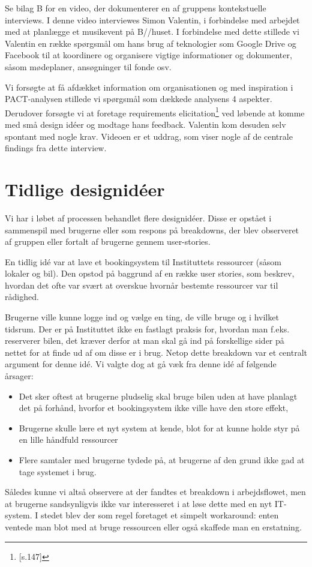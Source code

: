 Se bilag B for en video, der dokumenterer en af gruppens kontekstuelle interviews. I denne video interviewes Simon Valentin, i forbindelse med arbejdet med at planlægge et musikevent på B//huset. I forbindelse med dette stillede vi Valentin en række spørgsmål om hans brug af teknologier som Google Drive og Facebook til at koordinere og organisere vigtige informationer og dokumenter, såsom mødeplaner, ansøgninger til fonde osv.

Vi forsøgte at få afdækket information om organisationen og med inspiration i PACT-analysen stillede vi spørgsmål som dækkede analysens 4 aspekter. Derudover forsøgte vi at foretage requirements elicitation\footnote{\citep{Benyon}[s.147]} ved løbende at komme med små design idéer og modtage hans feedback. Valentin kom desuden selv spontant med nogle krav. Videoen er et uddrag, som viser nogle af de centrale findings fra dette interview.

\section{Tidlige designidéer}
Vi har i løbet af processen behandlet flere designidéer. Disse er opstået i sammenspil med brugerne eller som respons på breakdowns, der blev observeret af gruppen eller fortalt af brugerne gennem user-stories.

En tidlig idé var at lave et bookingsystem til Instituttets ressourcer (såsom lokaler og bil). Den opstod på baggrund af en række user stories, som beskrev, hvordan det ofte var svært at overskue hvornår bestemte ressourcer var til rådighed.

Brugerne ville kunne logge ind og vælge en ting, de ville bruge og i hvilket tidsrum. Der er på Instituttet ikke en fastlagt praksis for, hvordan man f.eks. reserverer bilen, det kræver derfor at man skal gå ind på forskellige sider på nettet for at finde ud af om disse er i brug. Netop dette breakdown var et centralt argument for denne idé. 
Vi valgte dog at gå væk fra denne idé af følgende årsager: 
\begin{itemize}
	\item Det sker oftest at brugerne pludselig skal bruge bilen uden at have planlagt det på forhånd, hvorfor et bookingsystem ikke ville have den store effekt,
	\item Brugerne skulle lære et nyt system at kende, blot for at kunne holde styr på en lille håndfuld ressourcer
	\item Flere samtaler med brugerne tydede på, at brugerne af den grund ikke gad at tage systemet i brug.
\end{itemize}
Således kunne vi altså observere at der fandtes et breakdown i arbejdsflowet, men at brugerne sandsynligvis ikke var interesseret i at løse dette med en nyt IT-system. I stedet blev der som regel foretaget et simpelt workaround: enten ventede man blot med at bruge ressourcen eller også skaffede man en erstatning.

